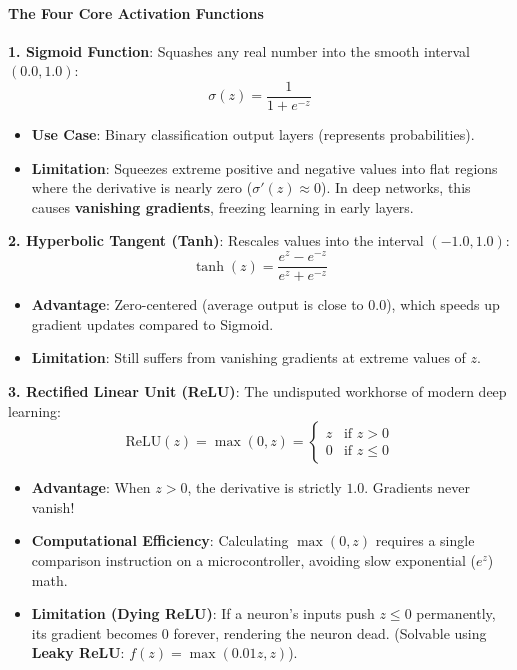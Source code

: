 \paragraph{The Four Core Activation Functions}

\textbf{1. Sigmoid Function}:
Squashes any real number into the smooth interval $(0.0, 1.0)$:
\begin{equation}
\sigma(z) = \frac{1}{1 + e^{-z}}\label{eq:sigmoid}
\end{equation}
\begin{itemize}
    \item \textbf{Use Case}: Binary classification output layers (represents probabilities).
    \item \textbf{Limitation}: Squeezes extreme positive and negative values into flat regions where the derivative is nearly zero ($\sigma'(z) \approx 0$). In deep networks, this causes \textbf{vanishing gradients}, freezing learning in early layers.
\end{itemize}

\textbf{2. Hyperbolic Tangent (Tanh)}:
Rescales values into the interval $(-1.0, 1.0)$:
\begin{equation}
\tanh(z) = \frac{e^z - e^{-z}}{e^z + e^{-z}}\label{eq:tanh}
\end{equation}
\begin{itemize}
    \item \textbf{Advantage}: Zero-centered (average output is close to 0.0), which speeds up gradient updates compared to Sigmoid.
    \item \textbf{Limitation}: Still suffers from vanishing gradients at extreme values of $z$.
\end{itemize}

\textbf{3. Rectified Linear Unit (ReLU)}:
The undisputed workhorse of modern deep learning:
\begin{equation}
\text{ReLU}(z) = \max(0, z) = \begin{cases} z & \text{if } z > 0 \\ 0 & \text{if } z \le 0 \end{cases}\label{eq:relu}
\end{equation}
\begin{itemize}
    \item \textbf{Advantage}: When $z > 0$, the derivative is strictly $1.0$. Gradients never vanish!
    \item \textbf{Computational Efficiency}: Calculating $\max(0, z)$ requires a single comparison instruction on a microcontroller, avoiding slow exponential ($e^z$) math.
    \item \textbf{Limitation (Dying ReLU)}: If a neuron's inputs push $z \le 0$ permanently, its gradient becomes $0$ forever, rendering the neuron dead. (Solvable using \textbf{Leaky ReLU}: $f(z) = \max(0.01z, z)$).
\end{itemize}

